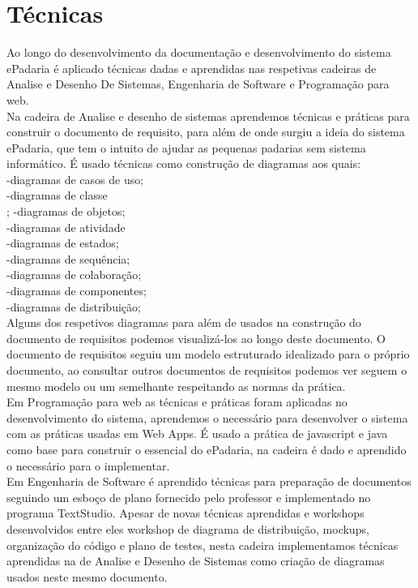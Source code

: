 \section{Técnicas}
Ao longo do desenvolvimento da documentação e desenvolvimento do sistema ePadaria é aplicado técnicas dadas e aprendidas nas respetivas cadeiras de Analise e Desenho De Sistemas, Engenharia de Software e Programação para web.\\
Na cadeira de Analise e desenho de sistemas aprendemos técnicas e práticas para construir o documento de requisito, para além de onde surgiu a ideia do sistema ePadaria, que tem o intuito de ajudar as pequenas padarias sem sistema informático. É usado técnicas como construção de diagramas aos quais:\\ 
-diagramas de casos de uso;\\ 
-diagramas de classe\\;
-diagramas de objetos;\\
-diagramas de atividade\\
-diagramas de estados;\\
-diagramas de sequência;\\
-diagramas de colaboração;\\
-diagramas de componentes;\\
-diagramas de distribuição;\\
Alguns dos respetivos diagramas para além de usados na construção do documento de requisitos podemos visualizá-los ao longo deste documento. O documento de requisitos seguiu um modelo estruturado idealizado para o próprio documento, ao consultar outros documentos de requisitos podemos ver seguem o mesmo modelo ou um semelhante respeitando as normas da prática.\\
Em Programação para web as técnicas e práticas foram aplicadas no desenvolvimento do sistema, aprendemos o necessário para desenvolver o sistema com as práticas usadas em Web Apps. É usado a prática de javascript e java como base para construir o essencial do ePadaria, na cadeira é dado e aprendido o necessário para o implementar.\\
Em Engenharia de Software é aprendido técnicas para preparação de documentos seguindo um esboço de plano fornecido pelo professor e implementado no programa TextStudio. Apesar de novas técnicas aprendidas e workshops desenvolvidos entre eles workshop de diagrama de distribuição, mockups, organização do código e plano de testes, nesta cadeira implementamos técnicas aprendidas na de Analise e Desenho de Sistemas como criação de diagramas usados neste mesmo documento.\\ 


